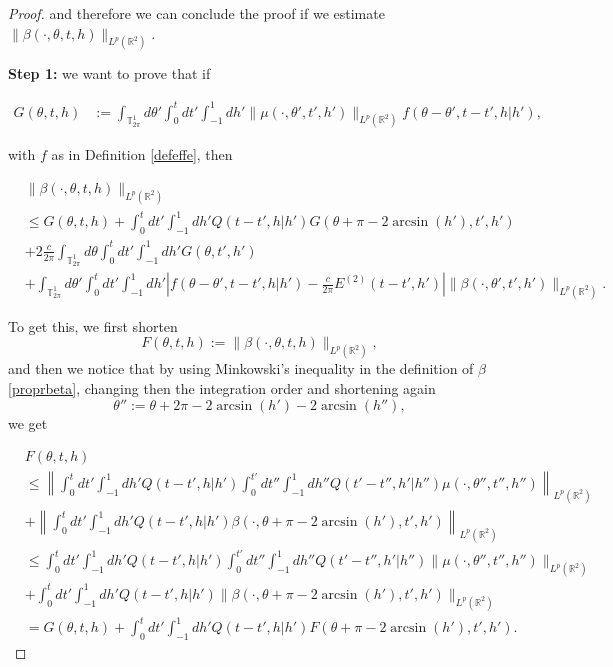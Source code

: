 \documentclass[a4paper,10pt,reqno]{amsart}
\numberwithin{equation}{subsection}
\numberwithin{figure}{subsection}
\begin{document}
\begin{proof}
and therefore we can conclude the proof if we estimate $\|\beta(\cdot,\theta,t,h)\|_{L^p(\mathbb{R}^2)}$.

\textbf{Step 1:} we want to prove that if

\begin{align*}
G(\theta,t,h)&:=\int_{\mathbb{T}^1_{2\pi}}d\theta'\int_0^tdt'\int_{-1}^1dh'\|\mu(\cdot,\theta',t',h')\|_{L^p(\mathbb{R}^2)}f(\theta-\theta',t-t',h|h'),
\end{align*}

with $f$ as in Definition \ref{defeffe}, then

{\small\begin{align}
\nonumber& \|\beta(\cdot,\theta,t,h)\|_{L^p(\mathbb{R}^2)}
\\
\label{normaLpcorrezioni1}&\leq G(\theta,t,h)+\int_0^tdt'\int_{-1}^1dh' Q(t-t',h|h')G(\theta+\pi-2\arcsin(h'),t',h')
\\
\label{normaLpcorrezioni2}&+2\frac{c}{2\pi}\int_{\mathbb{T}^1_{2\pi}}d\theta\int_0^tdt'\int_{-1}^1dh'G(\theta,t',h')
\\
\nonumber&+\int_{\mathbb{T}^1_{2\pi}}d\theta'\int_0^tdt'\int_{-1}^1dh'\left|f(\theta-\theta',t-t',h|h')-\frac{c}{2\pi}E^{(2)}(t-t',h')\right|\|\beta(\cdot,\theta',t',h')\|_{L^p(\mathbb{R}^2)}.
\end{align}}

To get this, we first shorten
\[
F(\theta,t,h):=\|\beta(\cdot,\theta,t,h)\|_{L^p(\mathbb{R}^2)},
\]
and then we notice that by using Minkowski's inequality in the definition of $\beta$ \eqref{proprbeta}, changing then the integration order and shortening again
\[
\theta'':=\theta+2\pi-2\arcsin(h')-2\arcsin(h''), 
\]
we get 

{\small\begin{align}
\nonumber &F(\theta,t,h)
\\
\nonumber&\leq\left\|\int_0^tdt'\int_{-1}^1dh' Q(t-t',h|h')\int_0^{t'}dt''\int_{-1}^1dh''Q(t'-t'',h'|h'')\mu(\cdot,\theta'',t'',h'')\right\|_{L^p(\mathbb{R}^2)}
\\
\nonumber&+\left\|\int_0^tdt'\int_{-1}^1dh' Q(t-t',h|h')\beta(\cdot,\theta+\pi-2\arcsin(h'),t',h')\right\|_{L^p(\mathbb{R}^2)}
\\
\nonumber&\leq\int_0^tdt'\int_{-1}^1dh' Q(t-t',h|h')\int_0^{t'}dt''\int_{-1}^1dh''Q(t'-t'',h'|h'')\|\mu(\cdot,\theta'',t'',h'')\|_{L^p(\mathbb{R}^2)}
\\
\nonumber&+\int_0^tdt'\int_{-1}^1dh' Q(t-t',h|h')\|\beta(\cdot,\theta+\pi-2\arcsin(h'),t',h')\|_{L^p(\mathbb{R}^2)}
\\
\label{ref:rel}&=G(\theta,t,h)+\int_0^tdt'\int_{-1}^1dh' Q(t-t',h|h')F(\theta+\pi-2\arcsin(h'),t',h').
\end{align}}


\end{proof}
\end{document}
